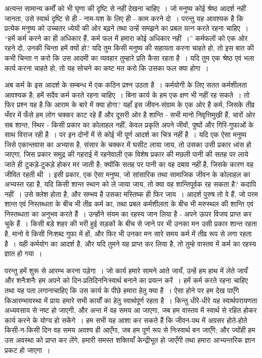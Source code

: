 अत्यन्त सामान्य कर्मों को भी घृणा की दृष्टि से नहीं देखना चाहिए~। जो मनुष्य कोई श्रेष्ठ आदर्श नहीं जानता, उसे स्वार्थ दृष्टि से ही - नाम-यश के लिए ही - काम करने दो~। परन्तु यह आवश्यक है कि प्रत्येक मनुष्य को उच्चतर ध्येयों की ओर बढ़ने तथा उन्हें समझने का प्रबल यत्न करते रहना चाहिए~। “हमें कर्म करने का ही अधिकार हैं, कर्म फल में हमारा कोई अधिकार नहीं~।” कर्मफलों को एक ओर रहने दो, उनकी चिन्ता हमें क्यों हो? यदि तुम किसी मनुष्य की सहायता करना चाहते हो, तो इस बात की कभी चिन्ता न करो कि उस आदमी का व्यवहार तुम्हारे प्रति कैसा रहता है~। यदि तुम एक श्रेष्ठ एवं भला कार्य करना चाहते हो, तो यह सोचने का कष्ट मत करो कि उसका फल क्या होगा~।

अब कर्म के इस आदर्श के सम्बन्ध में एक कठिन प्रश्न उठता है~। कर्मयोगी के लिए सतत कर्मशीलता आवश्यक है; हमें सदैव कर्म करते रहना चाहिए~। बिना कार्य के हम एक क्षण भी नहीं रह सकते~। तो फिर प्रश्न यह है कि आराम के बारे में क्या होगा? यहाँ इस जीवन-संग्राम के एक ओर है कर्म, जिसके तीव्र भँवर में फँसे हम लोग चक्कर काट रहे हैं और दूसरी ओर है शान्ति - सभी मानो निवृत्तिमुखी हैं, चारों ओर सब शान्त, स्थिर - किसी प्रकार का कोलाहल नहीं, केवल प्रकृति अपने जीवों, पुष्पों और गिरि-गुफाओं के साथ विराज रही है~। पर इन दोनों में से कोई भी पूर्ण आदर्श का चित्र नहीं है~। यदि एक ऐसा मनुष्य जिसे एकान्तवास का अभ्यास है, संसार के चक्कर में घसीट लाया जाय, तो उसका उसी प्रकार ध्वंस हो जाएगा, जिस प्रकार समुद्र की गहराई में रहनेवाली एक विशेष प्रकार की मछली पानी की सतह पर लाये जाते ही टुकड़े-टुकड़े होकर मर जाती है; क्योंकि सतह पर पानी का वह दबाव नहीं है, जिसके कारण वह जीवित रहती थी~। इसी प्रकार, एक ऐसा मनुष्य, जो सांसारिक तथा सामाजिक जीवन के कोलाहल का अभ्यस्त रहा है, यदि किसी शान्त स्थान को ले जाया जाय, तो क्या वह शान्तिपूर्वक रह सकता है? कदापि नहीं~। उसे क्लेश होता है, और सम्भव है उसका मस्तिष्क ही फिर जाय~। आदर्श पुरुष तो वे हैं, जो परम शान्त एवं निस्तब्धता के बीच भी तीव्र कर्म का, तथा प्रबल कर्मशीलता के बीच भी मरुस्थल की शान्ति एवं निस्तब्धता का अनुभव करते हैं~। उन्होंने संयम का रहस्य जान लिया है - अपने ऊपर विजय प्राप्त कर चुके हैं~। किसी बड़े शहर की भरी हुई सड़कों के बीच से जाने पर भी उनका मन उसी प्रकार शान्त रहता है, मानो वे किसी निःशब्द गुफा में हों, और फिर भी उनका मन सारे समय कर्म में तीव्र रूप से लगा रहता है~। यही कर्मयोग का आदर्श है, और यदि तुमने यह प्राप्त कर लिया है, तो तुम्हे वास्तव में कर्म का रहस्य ज्ञात हो गया~।

परन्तु हमें शुरू से आरम्भ करना पड़ेगा~। जो कार्य हमारे सामने आते जायँ, उन्हें हम हाथ में लेते जायँ और शनैःशनैः हम अपने को दिन-प्रतिदिन\break निःस्वार्थ बनाने का प्रयत्न करें~। हमें कर्म करते रहना चाहिए तथा यह पता लगाना\break चाहिए कि उस कार्य के पीछे हमारा हेतु क्या है~। ऐसा होने पर हम देख पाएँगे कि\break आरम्भावस्था में प्रायः हमारे सभी कार्यों का हेतु स्वार्थपूर्ण रहता है~। किन्तु धीरे-धीरे यह स्वार्थपरायणता अध्यवसाय से नष्ट हो जाएगी, और अन्त में वह समय आ जाएगा, जब हम वास्तव में स्वार्थ से रहित होकर कार्य करने के योग्य हो सकेंगे~। हम सभी यह आशा कर सकते हैं कि जीवन-पथ में अग्रसर होते-होते किसी-न-किसी दिन वह समय अवश्य ही आएँगा, जब हम पूर्ण रूप से निःस्वार्थ बन जाएँगे; और ज्योंही हम उस अवस्था को प्राप्त कर लेंगे, हमारी समस्त शक्तियाँ केन्द्रीभूत हो जाएँगी तथा हमारा आभ्यन्तरिक ज्ञान प्रकट हो जाएगा~।

